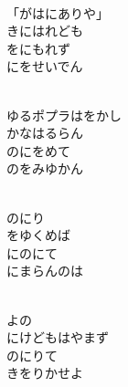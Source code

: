 \documentclass[10pt,b5j]{tarticle} %
\begin{document}
\vspace{1.5em} %
\newcommand{\linespace}{0.5em} %
\newcommand{\blocksize}{0.5\hsize} %
\newcommand{\itemmargin}{6em} %
\begin{enumerate} %
    \setlength{\itemindent}{\itemmargin} %
    \begin{minipage}[c]{\blocksize}
    
        \vspace{\linespace}
        \item~\\
        「がはにありや」\\
        きにはれども\\
        をにもれず\\
        にをせいでん
        
        \vspace{\linespace}
        \item~\\
        ゆるポプラはをかし\\
        かなはるらん\\
        のにをめて\\
        のをみゆかん
        
        \vspace{\linespace}
        \item~\\
        のにり\\
        をゆくめば\\
        にのにて\\
        にまらんのは
        
        \vspace{\linespace}
        \item~\\
        よの\\
        にけどもはやまず\\
        のにりて\\
        きをりかせよ
        

\end{minipage}
\end{enumerate}
\end{document}

